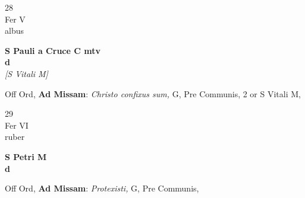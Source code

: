 \documentclass[10pt, openany]{book}
\begin{document}
        \begin{center}
            \begin{minipage}{3.5in}
                \vspace{2em}
                \begin{minipage}{0.5in}
                    {\Huge 28} \\
                    {\normalsize Fer V} \\
                    {\normalsize albus}
                \end{minipage}
                \begin{minipage}{3.0in}
                    \textbf{ \large S Pauli a Cruce C mtv \\
                    \textnormal{\normalsize d}} \\ \textit{[S Vitali M]} \\ 
                \end{minipage}
                \begin{justify}Off Ord, \textbf{Ad Missam}: \textit{Christo confixus sum,} G, Pre Communis, 2 or S Vitali M,  
                \end{justify}
            \end{minipage}
        \end{center}
    
        \begin{center}
            \begin{minipage}{3.5in}
                \vspace{2em}
                \begin{minipage}{0.5in}
                    {\Huge 29} \\
                    {\normalsize Fer VI} \\
                    {\normalsize ruber}
                \end{minipage}
                \begin{minipage}{3.0in}
                    \textbf{ \large S Petri M \\
                    \textnormal{\normalsize d}} \\ 
                \end{minipage}
                \begin{justify}Off Ord, \textbf{Ad Missam}: \textit{Protexisti,} G, Pre Communis,  
                \end{justify}
            \end{minipage}
        \end{center}
    
\end{document}
